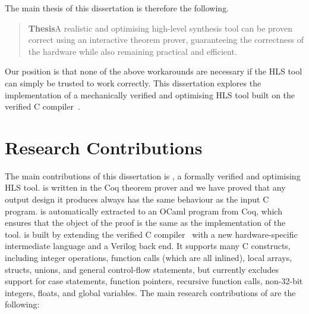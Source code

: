 The main thesis of this dissertation is therefore the following.

\begin{samepage}
  \begin{quote}
    \textbf{Thesis}\quad A realistic and optimising high-level synthesis tool
    can be proven correct using an interactive theorem prover, guaranteeing the
    correctness of the hardware while also remaining practical and efficient.
  \end{quote}
\end{samepage}

Our position is that none of the above workarounds are necessary if the
\gls{HLS} tool can simply be trusted to work correctly.  This dissertation
explores the implementation of a mechanically verified and optimising \gls{HLS}
tool built on the \compcert{} verified C
compiler~\cite{leroy09_formal_verif_realis_compil}.



\section{Research Contributions}%
\label{sec:intro:research-contributions}

The main contributions of this dissertation is \vericert{}, a formally verified
and optimising \gls{HLS} tool.  \vericert{} is written in the Coq theorem prover
and we have proved that any output design it produces always has the same
behaviour as the input C program.  \vericert{} is automatically extracted to an
OCaml program from Coq, which ensures that the object of the proof is the same
as the implementation of the tool.  \vericert{} is built by extending the
\compcert{} verified C compiler~\cite{leroy09_formal_verif_realis_compil} with a
new hardware-specific intermediate language and a Verilog back end.  It supports
many C constructs, including integer operations, function calls (which are all
inlined), local arrays, structs, unions, and general control-flow statements,
but currently excludes support for case statements, function pointers, recursive
function calls, non-32-bit integers, floats, and global variables.  The main
research contributions of \vericert{} are the following:

